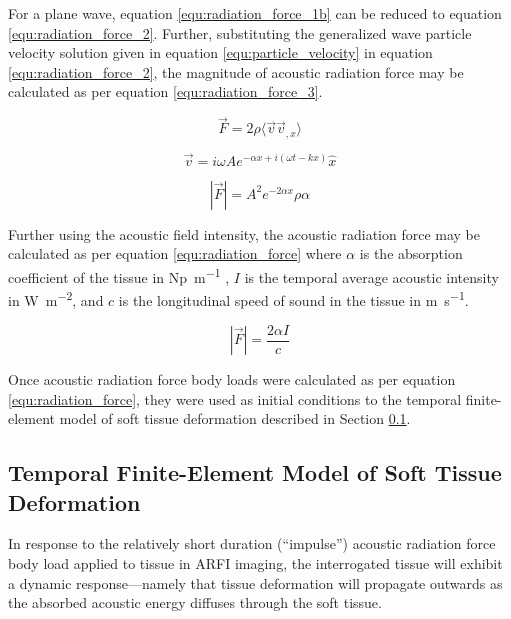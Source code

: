 			For a plane wave, equation \ref{equ:radiation_force_1b} can be reduced to equation \ref{equ:radiation_force_2}. Further, substituting the generalized wave particle velocity solution given in equation \ref{equ:particle_velocity} in equation \ref{equ:radiation_force_2}, the magnitude of acoustic radiation force may be calculated as per equation \ref{equ:radiation_force_3}.

			\begin{equation}
				\label{equ:radiation_force_2}
				\vec{F} = 2\rho\langle \vec{v} \vec{v}_{,x} \rangle
			\end{equation}

			\begin{equation}
				\label{equ:particle_velocity}
				\vec{v} = i\omega A e^{-\alpha x + i\left(\omega t - k x\right)}\hat{x}
			\end{equation}

			\begin{equation}
				\label{equ:radiation_force_3}
				\left|\vec{F}\right| = A^2 e^{-2\alpha x}\rho\alpha
			\end{equation}

			Further using the acoustic field intensity, the acoustic radiation force may be calculated as per equation \ref{equ:radiation_force} where $\alpha$ is the absorption coefficient of the tissue in \si{Np\per\m} , $I$ is the temporal average acoustic intensity in \si{\W\per\m\squared}, and $c$ is the longitudinal speed of sound in the tissue in \si{\m\per\s}.

			\begin{equation}
				\label{equ:radiation_force}
				\left|\vec{F}\right| = \frac{2\alpha I}{c}
			\end{equation}

			Once acoustic radiation force body loads were calculated as per equation \ref{equ:radiation_force}, they were used as initial conditions to the temporal finite-element model of soft tissue deformation described in Section \ref{sec:temporal_fea_arfi}.

		\subsection{Temporal Finite-Element Model of Soft Tissue Deformation}
			\label{sec:temporal_fea_arfi}
			In response to the relatively short duration (``impulse'') acoustic radiation force body load applied to tissue in ARFI imaging, the interrogated tissue will exhibit a dynamic response---namely that tissue deformation will propagate outwards as the absorbed acoustic energy diffuses through the soft tissue.

